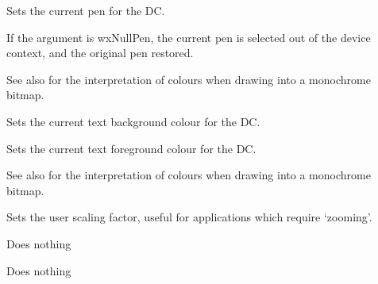 \label{wxsvgfiledcsetpen}


Sets the current pen for the DC.

If the argument is wxNullPen, the current pen is selected out of the device
context, and the original pen restored.

See also  for the interpretation of colours
when drawing into a monochrome bitmap.

\label{wxsvgfiledcsettextbackground}


Sets the current text background colour for the DC.

\label{wxsvgfiledcsettextforeground}


Sets the current text foreground colour for the DC.

See also  for the interpretation of colours
when drawing into a monochrome bitmap.

\label{wxsvgfiledcsetuserscale}


Sets the user scaling factor, useful for applications which require
`zooming'.

\label{wxsvgfiledcstartdoc}


Does nothing

\label{wxsvgfiledcstartpage}


Does nothing
